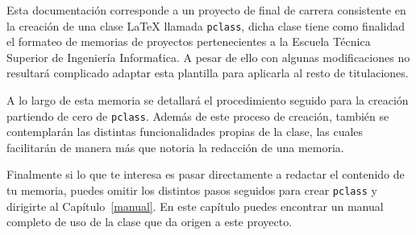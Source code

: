 
Esta documentaci\'on corresponde a un proyecto de final de carrera consistente en la creaci\'on de una clase \LaTeX{} llamada
\texttt{pclass}, dicha clase tiene como finalidad el formateo de memorias de proyectos pertenecientes a la Escuela T\'ecnica Superior de Ingenier\'ia Informa\'tica. A pesar de ello con algunas modificaciones no resultar\'a complicado adaptar esta plantilla para aplicarla al resto de titulaciones.

A lo largo de esta memoria se detallar\'a el procedimiento seguido para la creaci\'on partiendo de cero de \texttt{pclass}.
Adem\'as de este proceso de creaci\'on, tambi\'en se contemplar\'an las distintas funcionalidades propias de la clase,
las cuales facilitar\'an de manera m\'as que notoria la redacci\'on de una memoria.

Finalmente si lo que te interesa es pasar directamente a redactar el contenido de tu memoria, puedes omitir los distintos
pasos seguidos para crear \texttt{pclass} y dirigirte al Cap\'itulo~\ref{manual}. En este cap\'itulo puedes encontrar un
manual completo de uso de la clase que da origen a este proyecto.



